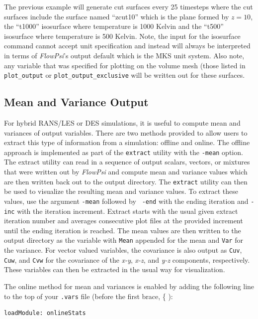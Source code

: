 \documentclass{article}
\begin{document}
The previous example will generate cut surfaces every 25 timesteps
where the cut surfaces include the surface named ``zcut10'' which is
the plane formed by $z=10$, the ``t1000'' isosurface where temperature
is 1000 Kelvin and the ``t500'' isosurface where temperature is 500
Kelvin.  Note, the input for the isosurface command cannot accept unit
specification and instead will always be interpreted in terms of
{\em FlowPsi}'s output default which is the MKS unit system.  Also note, any
variable that was specified for plotting on the volume mesh (those
listed in {\tt plot\_output} or {\tt plot\_output\_exclusive} will be
written out for these surfaces.

\subsection{Mean and Variance Output}

For hybrid RANS/LES or DES simulations, it is useful to compute mean
and variances of output variables.  There are two methods provided
to allow users to extract this type of information from a
simulation: offline and online.  The offline approach is implemented
as part of the {\tt extract} utility with the {\tt -mean} option.  The
extract utility can read in a sequence of output scalars, vectors, or
mixtures that were written out by {\em FlowPsi} and compute mean and
variance values which are then written back out to the output
directory.  The {\tt extract} utility can then be used to visualize
the resulting mean and  variance values.  To
extract these values, use the argument {\tt -mean} followed by {\tt
  -end} with the ending iteration and {\tt -inc} with the iteration
increment.  Extract starts with the usual given extract iteration number and
averages consecutive plot files at the provided increment until the
ending iteration is reached.  The mean values are then written to the
output directory as the variable with {\tt Mean} appended for the mean
and {\tt Var} for the variance.  For vector valued variables, the
covariance is also output as {\tt Cuv}, {\tt Cuw}, and {\tt Cvw} for the
covariance of the {\it x-y}, {\it x-z}, and {\it y-z} components,
respectively.  These variables can then be extracted in the usual way
for visualization.

The online method for mean and variances is enabled by adding the
following line to the top of your {\tt .vars} file (before the first brace, \{ ):

\begin{verbatim}
loadModule: onlineStats
\end{verbatim}
\end{document}
